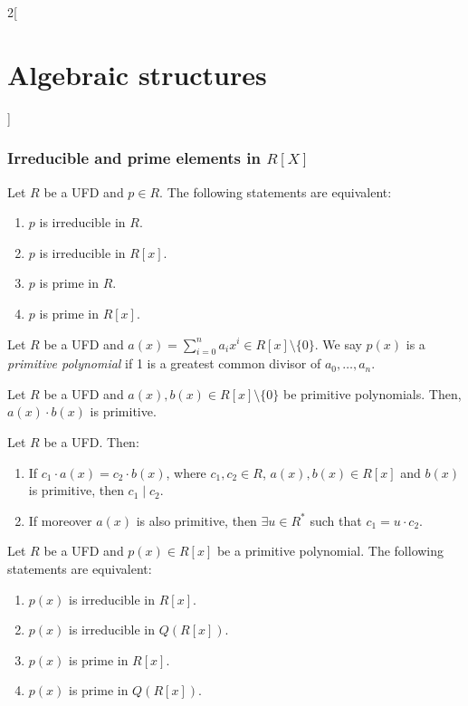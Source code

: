 \documentclass[../../../main.tex]{subfiles}
\begin{document}
\begin{multicols}{2}[\section{Algebraic structures}]
    \subsubsection*{Irreducible and prime elements in $R[X]$}
    \begin{prop}
        Let $R$ be a UFD and $p\in R$. The following statements are equivalent:
        \begin{enumerate}
            \item $p$ is irreducible in $R$.
            \item $p$ is irreducible in $R[x]$.
            \item $p$ is prime in $R$.
            \item $p$ is prime in $R[x]$.
        \end{enumerate}
    \end{prop}
    \begin{definition}
        Let $R$ be a UFD and $a(x)=\sum_{i=0}^na_ix^i\in R[x]\setminus\{0\}$. We say $p(x)$ is a \textit{primitive polynomial} if 1 is a greatest common divisor of $a_0,\ldots,a_n$.
    \end{definition}
    \begin{lemma}
        Let $R$ be a UFD and $a(x),b(x)\in R[x]\setminus\{0\}$ be primitive polynomials. Then, $a(x)\cdot b(x)$ is primitive.
    \end{lemma}
    \begin{lemma}
        Let $R$ be a UFD. Then:
        \begin{enumerate}
            \item If $c_1\cdot a(x)=c_2\cdot b(x)$, where $c_1,c_2\in R$, $a(x),b(x)\in R[x]$ and $b(x)$ is primitive, then $c_1\mid c_2$.
            \item If moreover $a(x)$ is also primitive, then $\exists u\in R^*$ such that $c_1=u\cdot c_2$.
        \end{enumerate}
    \end{lemma}
    \begin{prop}
        Let $R$ be a UFD and $p(x)\in R[x]$ be a primitive polynomial. The following statements are equivalent:
        \begin{enumerate}
            \item $p(x)$ is irreducible in $R[x]$.
            \item $p(x)$ is irreducible in $Q(R[x])$.
            \item $p(x)$ is prime in $R[x]$.
            \item $p(x)$ is prime in $Q(R[x])$.

\end{enumerate}
\end{prop}
\end{multicols}
\end{document}
